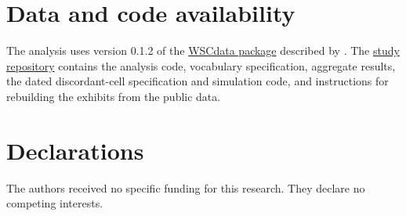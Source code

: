 \documentclass[twoside,11pt]{article}
\begin{document}
\section*{Data and code availability}

The analysis uses version 0.1.2 of the \href{https://cran.r-project.org/package=WSCdata}{WSCdata package} described by \citet{keller2025}. The \href{https://github.com/fightforbelief/observational-causal-validation}{study repository} contains the analysis code, vocabulary specification, aggregate results, the dated discordant-cell specification and simulation code, and instructions for rebuilding the exhibits from the public data.

\section*{Declarations}
The authors received no specific funding for this research. They declare no competing interests.


\end{document}
